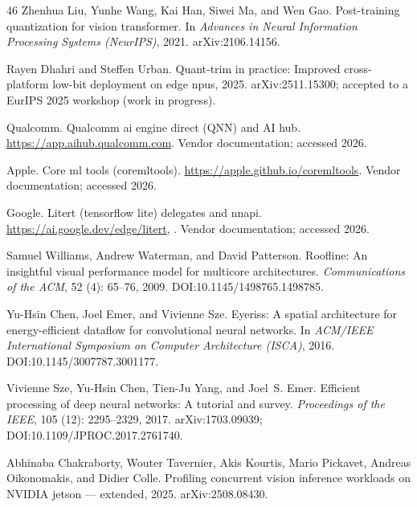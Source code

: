 \documentclass[11pt]{article}
\begin{document}
\begin{thebibliography}{46}
Zhenhua Liu, Yunhe Wang, Kai Han, Siwei Ma, and Wen Gao.
\newblock Post-training quantization for vision transformer.
\newblock In \emph{Advances in Neural Information Processing Systems (NeurIPS)}, 2021.
\newblock arXiv:2106.14156.

Rayen Dhahri and Steffen Urban.
\newblock Quant-trim in practice: Improved cross-platform low-bit deployment on edge npus, 2025.
\newblock arXiv:2511.15300; accepted to a EurIPS 2025 workshop (work in progress).

{Qualcomm}.
\newblock Qualcomm ai engine direct ({QNN}) and {AI} hub.
\newblock \url{https://app.aihub.qualcomm.com}.
\newblock Vendor documentation; accessed 2026.

{Apple}.
\newblock Core ml tools ({coremltools}).
\newblock \url{https://apple.github.io/coremltools}.
\newblock Vendor documentation; accessed 2026.

{Google}.
\newblock Litert (tensorflow lite) delegates and nnapi.
\newblock \url{https://ai.google.dev/edge/litert}, {}.
\newblock Vendor documentation; accessed 2026.

Samuel Williams, Andrew Waterman, and David Patterson.
\newblock Roofline: An insightful visual performance model for multicore architectures.
\newblock \emph{Communications of the ACM}, 52 (4): 65--76, 2009.
\newblock DOI:10.1145/1498765.1498785.

Yu-Hsin Chen, Joel Emer, and Vivienne Sze.
\newblock Eyeriss: A spatial architecture for energy-efficient dataflow for convolutional neural networks.
\newblock In \emph{ACM/IEEE International Symposium on Computer Architecture (ISCA)}, 2016.
\newblock DOI:10.1145/3007787.3001177.

Vivienne Sze, Yu-Hsin Chen, Tien-Ju Yang, and Joel~S. Emer.
\newblock Efficient processing of deep neural networks: A tutorial and survey.
\newblock \emph{Proceedings of the IEEE}, 105 (12): 2295--2329, 2017.
\newblock arXiv:1703.09039; DOI:10.1109/JPROC.2017.2761740.

Abhinaba Chakraborty, Wouter Tavernier, Akis Kourtis, Mario Pickavet, Andreas Oikonomakis, and Didier Colle.
\newblock Profiling concurrent vision inference workloads on {NVIDIA} jetson --- extended, 2025.
\newblock arXiv:2508.08430.


\end{thebibliography}
\end{document}
